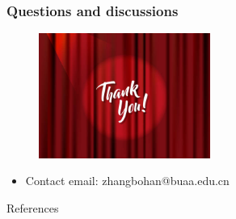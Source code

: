 \documentclass[aspectratio=169]{beamer}
\begin{document}
\begin{frame}
\frametitle{Questions and discussions}%

	\vspace{-0.15in}
\begin{figure}[h!]
	\centering
	\includegraphics[width=0.5\textwidth]{end.jpg}
\end{figure}

\Large
\begin{center}
	\begin{itemize}
		\centering
		\vspace{-0.05in}
		
		\item[] \small\color{purple}Contact email: {\color{blue}   zhangbohan@buaa.edu.cn}
   
	\end{itemize}
\end{center}


\end{frame}



\begin{frame}[noframenumbering]{References}
	
			
\end{frame}
\end{document}
